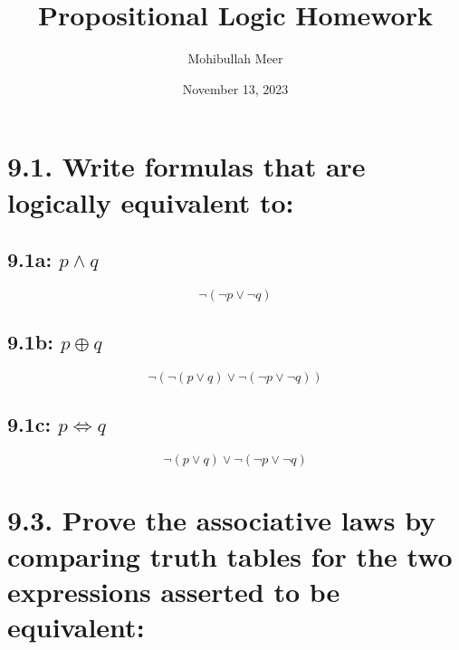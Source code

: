 \documentclass{article}
\title{Propositional Logic Homework}
\author{Mohibullah Meer}
\date{November 13, 2023}
\begin{document}
\maketitle
\section*{9.1. Write formulas that are logically equivalent to:}
\subsection*{9.1a: $p\land q$}
\[\neg(\neg p\lor\neg q)\]
\subsection*{9.1b: $p\oplus q$}
\[\neg(\neg(p\lor q) \lor\neg(\neg p\lor\neg q))\]
\subsection*{9.1c: $p\Leftrightarrow q$}
\[\neg(p\lor q)\lor\neg(\neg p\lor\neg q)\]
\section*{9.3. Prove the associative laws by comparing truth tables for the two expressions asserted to be equivalent:}
\end{document}
